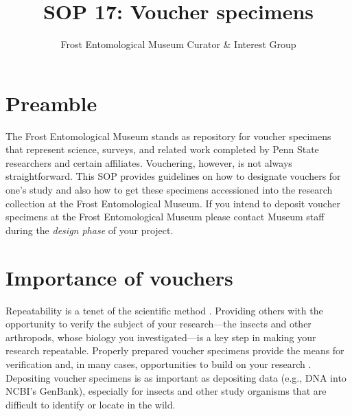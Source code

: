 \documentclass[letterpaper, 11pt]{article}
\title{SOP 17: Voucher specimens}
\author{Frost Entomological Museum Curator \& Interest Group}
\begin{document}
\cleanlookdateon %
\maketitle
\thispagestyle{fancy}

\section*{Preamble}

The Frost Entomological Museum stands as repository for voucher specimens that represent science, surveys, and related work completed by Penn State researchers and certain affiliates. Vouchering, however, is not always straightforward. This SOP provides guidelines on how to designate vouchers for one's study and also how to get these specimens accessioned into the research collection at the Frost Entomological Museum. If you intend to deposit voucher specimens at the Frost Entomological Museum please contact Museum staff during the \textit{design phase} of your project. 

\section{Importance of vouchers}
Repeatability is a tenet of the scientific method \cite{1}. Providing others with the opportunity to verify the subject of your research---the insects and other arthropods, whose biology you investigated---is a key step in making your research repeatable. Properly prepared voucher specimens provide the means for verification and, in many cases, opportunities to build on your research \cite{2,3,4,5,6,7}. Depositing voucher specimens is as important as depositing data (e.g., DNA into NCBI's GenBank), especially for insects and other study organisms that are difficult to identify or locate in the wild. 
\end{document}
